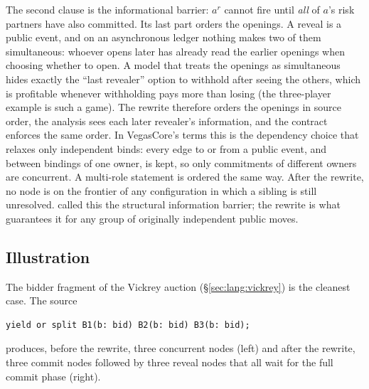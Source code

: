 The second clause is the informational barrier: $a^{r}$ cannot
fire until \emph{all} of $a$'s risk partners have also committed.
Its last part orders the openings.  A reveal is a public event, and
on an asynchronous ledger nothing makes two of them simultaneous:
whoever opens later has already read the earlier openings when
choosing whether to open.  A model that treats the openings as
simultaneous hides exactly the ``last revealer'' option to withhold
after seeing the others, which is profitable whenever withholding
pays more than losing (the three-player  example is
such a game).  The rewrite therefore orders the openings in source
order, the analysis sees each later revealer's information, and the
contract enforces the same order.  In VegasCore's terms this is the
dependency choice that relaxes only independent binds: every edge to or
from a public event, and between bindings of one owner, is kept, so
only commitments of different owners are concurrent.  A multi-role
 statement is ordered the same way.
After the rewrite, no \REVEAL node is on the frontier of any
configuration in which a sibling \COMMIT is still unresolved.
 called this the structural
information barrier; the rewrite is what guarantees it for any
group of originally independent public moves.

\subsection{Illustration}

The bidder fragment of the Vickrey auction
(\S\ref{sec:lang:vickrey}) is the cleanest case.  The source

\begin{lstlisting}[style=vg]
yield or split B1(b: bid) B2(b: bid) B3(b: bid);
\end{lstlisting}

produces, before the rewrite, three concurrent \PUBLIC nodes
(left) and after the rewrite, three commit nodes followed by three
reveal nodes that all wait for the full commit phase (right).

